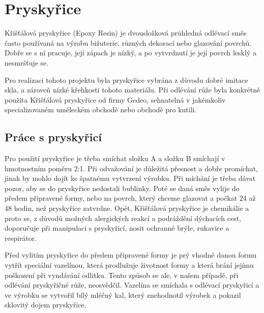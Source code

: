 \section{Pryskyřice}
Křišťálová pryskyřice (Epoxy Resin) je dvousložková průhledná odlévací směs často používaná na výrobu bižuterie, různých dekorací nebo glazování povrchů. Dobře se s ní pracuje, její zápach je nízký, a po vytvrdnutí je její povrch lesklý a nesmršťuje se. 

Pro realizaci tohoto projektu byla pryskyřice vybrána z důvodu dobré imitace skla, a zároveň nízké křehkosti tohoto materiálu. 
Při odlévání růže byla konkrétně použita Křišťálová pryskyřice od firmy Gedeo, sehnatelná v jakémkoliv specializovaném uměleckém obchodě nebo obchodě pro kutili. 


\subsection{Práce s pryskyřicí}

Pro použití pryskyřice je třeba smíchat složku A a složku B smíchají v hmotnostním poměru 2:1. Při odvažování je důležitá přesnost a dobře promíchat, jinak by mohlo dojít ke špatnému vytvrzení výrobku. Při míchání je třeba dávat pozor, aby se do pryskyřice nedostali bublinky. Poté se daná směs vylije do předem připravené formy, nebo na povrch, který chceme glazovat a počkat 24 až 48 hodin, než pryskyřice zatvrdne. Opět, Křišťálová pryskyřice je chemikálie a proto se, z důvodů možných alergických reakcí a podráždění dýchacích cest, doporučuje při manipulaci s pryskyřicí, nosit ochranné brýle, rukavice a respirátor. 

Před vylitím pryskyřice do předem připravené formy je prý vhodné danou formu vytřít speciální vazelínou, která prodlužuje životnost formy a která brání jejímu poškození při vyndávání odlitku. Tento způsob se ale, v našem případě, při odlévání pryskyřičné růže, neosvědčil. Vazelína se smíchala s odlévací pryskyřicí a ve výrobku se vytvořil bílý mléčný kal, který znehodnotil výrobek a pokazil sklovitý dojem pryskyřice.







